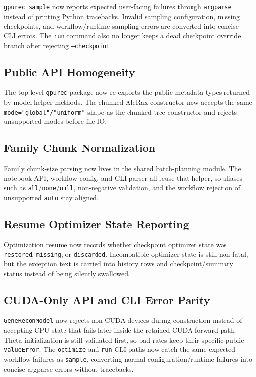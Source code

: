 \documentclass[11pt]{article}
\begin{document}
\texttt{gpurec sample} now reports expected user-facing failures through
\texttt{argparse} instead of printing Python tracebacks.  Invalid sampling
configuration, missing checkpoints, and workflow/runtime sampling errors are
converted into concise CLI errors.  The \texttt{run} command also no longer
keeps a dead checkpoint override branch after rejecting \texttt{--checkpoint}.

\subsection{Public API Homogeneity}

The top-level \texttt{gpurec} package now re-exports the public metadata types
returned by model helper methods.  The chunked AleRax constructor now accepts
the same \texttt{mode="global"/"uniform"} shape as the chunked tree
constructor and rejects unsupported modes before file IO.

\subsection{Family Chunk Normalization}

Family chunk-size parsing now lives in the shared batch-planning module.  The
notebook API, workflow config, and CLI parser all reuse that helper, so aliases
such as \texttt{all}/\texttt{none}/\texttt{null}, non-negative validation, and
the workflow rejection of unsupported \texttt{auto} stay aligned.

\subsection{Resume Optimizer State Reporting}

Optimization resume now records whether checkpoint optimizer state was
\texttt{restored}, \texttt{missing}, or \texttt{discarded}.  Incompatible
optimizer state is still non-fatal, but the exception text is carried into
history rows and checkpoint/summary status instead of being silently swallowed.

\subsection{CUDA-Only API and CLI Error Parity}

\texttt{GeneReconModel} now rejects non-CUDA devices during construction instead
of accepting CPU state that fails later inside the retained CUDA forward path.
Theta initialization is still validated first, so bad rates keep their specific
public \texttt{ValueError}.  The \texttt{optimize} and \texttt{run} CLI paths now
catch the same expected workflow failures as \texttt{sample}, converting normal
configuration/runtime failures into concise argparse errors without tracebacks.
\end{document}
